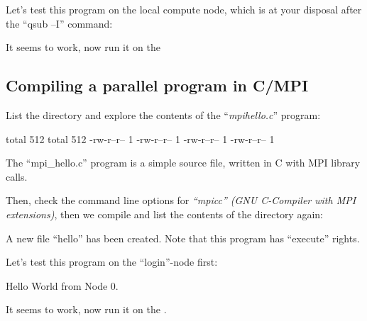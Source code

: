 Let's test this program on the local compute node, which is at your disposal
after the ``qsub --I'' command:



It seems to work, now run it on the \hpc
\begin{prompt}
\end{prompt}

\subsection{Compiling a parallel program in C/MPI}

\begin{prompt}
\end{prompt}

List the directory and explore the contents of the ``\textit{mpihello.c}'' program:
\begin{prompt}
total 512
total 512
-rw-r--r-- 1 %
-rw-r--r-- 1 %
-rw-r--r-- 1 %
-rw-r--r-- 1 %
\end{prompt}


The ``mpi\_hello.c'' program is a simple source file, written in C with MPI library calls.

Then, check the command line options for \emph{``mpicc'' (GNU C-Compiler with
MPI extensions)}, then we compile and list the contents of the directory again:

\begin{prompt}
\end{prompt}

A new file ``hello'' has been created. Note that this program has ``execute''
rights.

Let's test this program on the ``login''-node first:

\begin{prompt}
Hello World from Node 0.
\end{prompt}

It seems to work, now run it on the \hpc.

